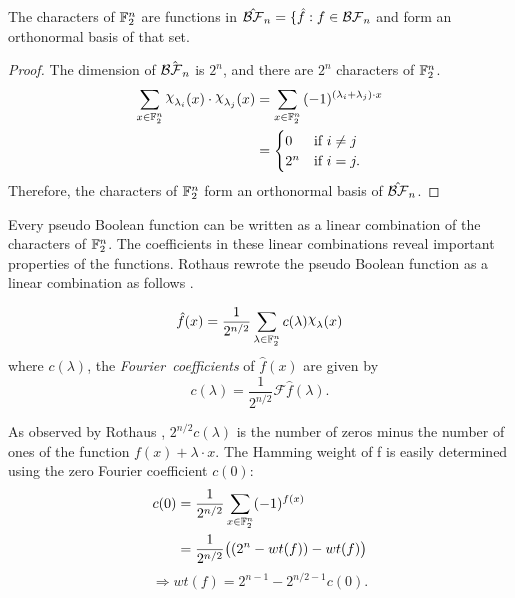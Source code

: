 \begin{lemma}
  The characters of $\mathbb{F}_2^n$ are functions in $\hat{\mathcal{BF}}_n
  =\{\hat{f}:f\in\mathcal{BF}_n$ and form an orthonormal basis of that set.
\end{lemma}
\begin{proof}
  The dimension of $\hat{\mathcal{BF}_n}$ is $2^n$, and there are $2^n$ characters of
  $\mathbb{F}_2^n$.
  \begin{align*}
    \sum_{x\in\gftwo^n}{\Chi_{\lambda_i}(x)\cdot\Chi_{\lambda_j}(x)}
    &=\sum_{x\in\gftwo^n}
      {(-1)^{(\lambda_i+\lambda_j)\cdot x}}\\
    &=\begin{cases}
      0 & \text{if } i\not=j \\
      2^n & \text{if } i=j.
    \end{cases}
  \end{align*}
  Therefore, the characters of $\mathbb{F}_2^n$ form an orthonormal basis of
  $\hat{\mathcal{BF}}_n$.
\end{proof}

\par Every pseudo Boolean function can be written as a linear combination of
the characters of $\mathbb{F}_2^n$. The coefficients in these linear combinations
reveal important properties of the functions. Rothaus rewrote the pseudo
Boolean function as a linear combination as follows \cite{art:r76}. 

\begin{lemma}
\begin{equation}\label{eqn:rewrite-pseudo}
	\hat{f}(x)
    =\frac{1}{2^{n/2}}
      \sum_{\lambda\in\gftwo^n}c(\lambda)\Chi_\lambda(x)
\end{equation}
	where $c(\lambda)$, the {\em Fourier\ coefficients} of $\hat{f}(x)$ are
  given by
	\[
  c(\lambda)=\frac{1}{2^{n/2}}\mathcal{F}\hat{f}(\lambda).
	\]
\end{lemma}

\par As observed by Rothaus \cite{art:r76}, $2^{n/2}c(\lambda)$ is the
number of zeros minus the number of ones of the function
$f(x)+\lambda\cdot x$. The Hamming weight of f is easily determined using
the zero Fourier coefficient $c(0)$:
\begin{align*}
	c(0)&=\frac{1}{2^{n/2}}\sum_{x\in\mathbb{F}_2^n}(-1)^{f(x)}\\
	&=\frac{1}{2^{n/2}}\big((2^n-wt(f))-wt(f)\big)
\end{align*}
\begin{equation}
  \Rightarrow wt(f)=2^{n-1}-2^{n/2-1}c(0).
\end{equation}

